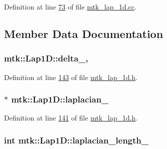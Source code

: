 Definition at line \hyperlink{mtk__lap__1d_8cc_source_l00073}{73} of file \hyperlink{mtk__lap__1d_8cc_source}{mtk\+\_\+lap\+\_\+1d.\+cc}.



\subsection{Member Data Documentation}
\hypertarget{classmtk_1_1Lap1D_a0feafd7b78e62be8644503d14c0204d9}{
\subsubsection[{delta\+\_\+}]{ mtk\+::\+Lap1\+D\+::delta\+\_\+\hspace{0.3cm}{\ttfamily [mutable]}, {\ttfamily [private]}}}\label{classmtk_1_1Lap1D_a0feafd7b78e62be8644503d14c0204d9}


Definition at line \hyperlink{mtk__lap__1d_8h_source_l00143}{143} of file \hyperlink{mtk__lap__1d_8h_source}{mtk\+\_\+lap\+\_\+1d.\+h}.

\hypertarget{classmtk_1_1Lap1D_a64a3977527c00b4ef994d1bd549f82fd}{
\subsubsection[{laplacian\+\_\+}]{$\ast$ mtk\+::\+Lap1\+D\+::laplacian\+\_\+\hspace{0.3cm}{\ttfamily [private]}}}\label{classmtk_1_1Lap1D_a64a3977527c00b4ef994d1bd549f82fd}


Definition at line \hyperlink{mtk__lap__1d_8h_source_l00141}{141} of file \hyperlink{mtk__lap__1d_8h_source}{mtk\+\_\+lap\+\_\+1d.\+h}.

\hypertarget{classmtk_1_1Lap1D_a05578b0729f2bb4fe8bb442fc555fa80}{
\subsubsection[{laplacian\+\_\+length\+\_\+}]{\setlength{\rightskip}{0pt plus 5cm}int mtk\+::\+Lap1\+D\+::laplacian\+\_\+length\+\_\+\hspace{0.3cm}{\ttfamily [private]}}}\label{classmtk_1_1Lap1D_a05578b0729f2bb4fe8bb442fc555fa80}


